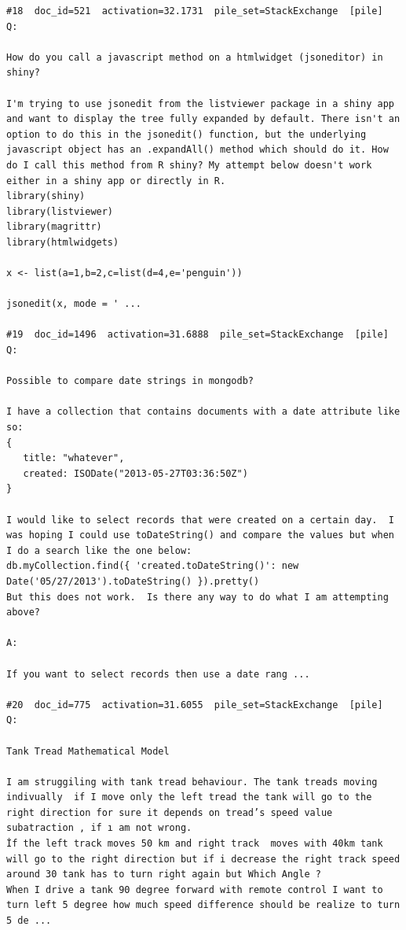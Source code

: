\begin{verbatim}
#18  doc_id=521  activation=32.1731  pile_set=StackExchange  [pile]
Q:

How do you call a javascript method on a htmlwidget (jsoneditor) in shiny?

I'm trying to use jsonedit from the listviewer package in a shiny app and want to display the tree fully expanded by default. There isn't an option to do this in the jsonedit() function, but the underlying javascript object has an .expandAll() method which should do it. How do I call this method from R shiny? My attempt below doesn't work either in a shiny app or directly in R.
library(shiny)
library(listviewer)
library(magrittr)
library(htmlwidgets)

x <- list(a=1,b=2,c=list(d=4,e='penguin'))

jsonedit(x, mode = ' ...

#19  doc_id=1496  activation=31.6888  pile_set=StackExchange  [pile]
Q:

Possible to compare date strings in mongodb?

I have a collection that contains documents with a date attribute like so:
{
   title: "whatever",
   created: ISODate("2013-05-27T03:36:50Z")
}

I would like to select records that were created on a certain day.  I was hoping I could use toDateString() and compare the values but when I do a search like the one below:
db.myCollection.find({ 'created.toDateString()': new Date('05/27/2013').toDateString() }).pretty()
But this does not work.  Is there any way to do what I am attempting above?

A:

If you want to select records then use a date rang ...

#20  doc_id=775  activation=31.6055  pile_set=StackExchange  [pile]
Q:

Tank Tread Mathematical Model

I am struggiling with tank tread behaviour. The tank treads moving indivually  if I move only the left tread the tank will go to the right direction for sure it depends on tread’s speed value subatraction , if ı am not wrong.
İf the left track moves 50 km and right track  moves with 40km tank will go to the right direction but if i decrease the right track speed around 30 tank has to turn right again but Which Angle ?
When I drive a tank 90 degree forward with remote control I want to turn left 5 degree how much speed difference should be realize to turn 5 de ...

\end{verbatim}

